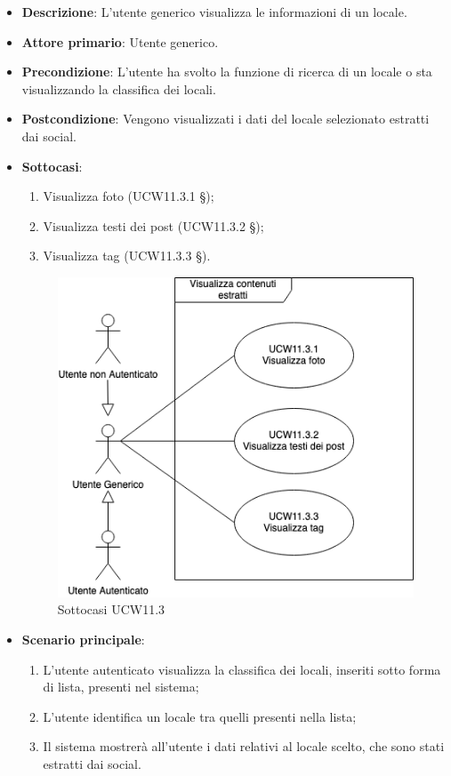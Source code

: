 \begin{itemize}
    \item \textbf{Descrizione}: L'utente generico visualizza le informazioni di un locale.
    \item \textbf{Attore primario}: Utente generico.
    \item \textbf{Precondizione}: L'utente ha svolto la funzione di ricerca di un locale o sta visualizzando la classifica dei locali.
    \item \textbf{Postcondizione}: Vengono visualizzati i dati del locale selezionato estratti dai social.
    \item \textbf{Sottocasi}:
	\begin{enumerate}
		\item Visualizza foto (UCW11.3.1 \S{});
		\item Visualizza testi dei post (UCW11.3.2 \S{});
		\item Visualizza tag (UCW11.3.3 \S{}).
	\end{enumerate}
	\begin{figure}[H]
	\centering
	\includegraphics[scale=0.5]{UC_images/UCW11-3.png} 
	\caption{Sottocasi UCW11.3}
	\end{figure}
    \item \textbf{Scenario principale}: 
    \begin{enumerate}
	\item L'utente autenticato visualizza la classifica dei locali, inseriti sotto forma di lista, presenti nel sistema;
    \item L'utente identifica un locale tra quelli presenti nella lista;
    \item Il sistema mostrerà all'utente i dati relativi al locale scelto, che sono stati estratti dai social.
    \end{enumerate}
\end{itemize}

